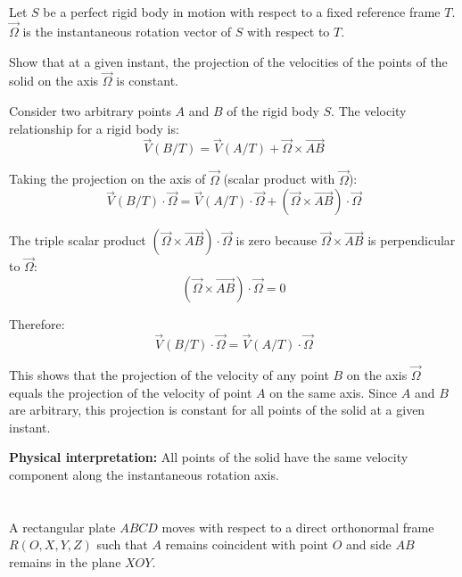 \documentclass[12pt]{article}
\begin{document}
\newpage

\section{}

Let $S$ be a perfect rigid body in motion with respect to a fixed reference frame $T$. $\vec{\Omega}$ is the instantaneous rotation vector of $S$ with respect to $T$.

Show that at a given instant, the projection of the velocities of the points of the solid on the axis $\vec{\Omega}$ is constant.

\begin{correctionbox}
Consider two arbitrary points $A$ and $B$ of the rigid body $S$. The velocity relationship for a rigid body is:
$$\vec{V}(B/T) = \vec{V}(A/T) + \vec{\Omega} \times \overrightarrow{AB}$$

Taking the projection on the axis of $\vec{\Omega}$ (scalar product with $\vec{\Omega}$):
$$\vec{V}(B/T) \cdot \vec{\Omega} = \vec{V}(A/T) \cdot \vec{\Omega} + (\vec{\Omega} \times \overrightarrow{AB}) \cdot \vec{\Omega}$$

The triple scalar product $(\vec{\Omega} \times \overrightarrow{AB}) \cdot \vec{\Omega}$ is zero because $\vec{\Omega} \times \overrightarrow{AB}$ is perpendicular to $\vec{\Omega}$:
$$(\vec{\Omega} \times \overrightarrow{AB}) \cdot \vec{\Omega} = 0$$

Therefore:
$$\vec{V}(B/T) \cdot \vec{\Omega} = \vec{V}(A/T) \cdot \vec{\Omega}$$

This shows that the projection of the velocity of any point $B$ on the axis $\vec{\Omega}$ equals the projection of the velocity of point $A$ on the same axis. Since $A$ and $B$ are arbitrary, this projection is constant for all points of the solid at a given instant.

\textbf{Physical interpretation:} All points of the solid have the same velocity component along the instantaneous rotation axis.
\end{correctionbox}

\newpage
\section{}

A rectangular plate $ABCD$ moves with respect to a direct orthonormal frame $R(O, X, Y, Z)$ such that $A$ remains coincident with point $O$ and side $AB$ remains in the plane $XOY$.
\end{document}
